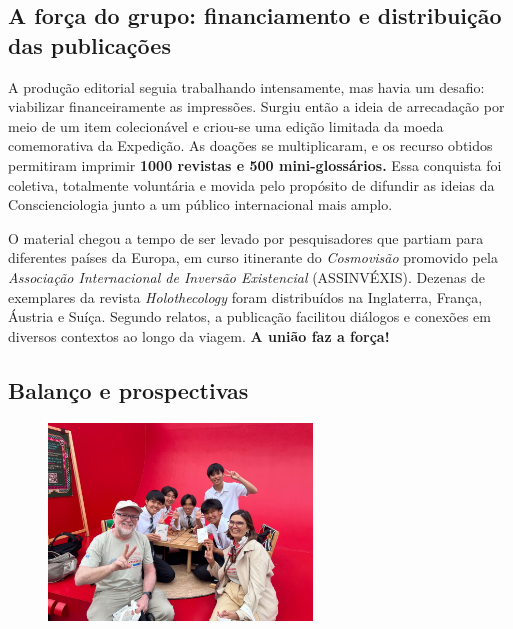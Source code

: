 \documentclass{gescons}
\begin{document}
\subsection*{A força do grupo: financiamento e distribuição das publicações}


A produção editorial seguia trabalhando intensamente, mas havia um desafio: viabilizar financeiramente as impressões. Surgiu então a ideia de arrecadação por meio de um item colecionável e criou-se uma edição limitada da moeda comemorativa da Expedição. As doações se multiplicaram, e os recurso obtidos permitiram imprimir \textbf{1000 revistas e 500 mini-glossários.} Essa conquista foi coletiva, totalmente voluntária e movida pelo propósito de difundir as ideias da Conscienciologia junto a um público internacional mais amplo.

O material chegou a tempo de ser levado por pesquisadores que partiam para diferentes países da Europa, em curso itinerante do \emph{Cosmovisão} promovido pela \emph{Associação Internacional de Inversão Existencial} (ASSINVÉXIS). Dezenas de exemplares da revista \emph{Holothecology} foram distribuídos na Inglaterra, França, Áustria e Suíça. Segundo relatos, a publicação facilitou diálogos e conexões em diversos contextos ao longo da viagem. \textbf{A união faz a força!}



\subsection*{Balanço e prospectivas}

\begin{figure}
  \vspace{-15mm}\hspace{-1mm}\includegraphics[width=7cm,trim={130 100 105 120},clip]{articles/resumo/fotos/materia3/japao.jpeg}
\end{figure}
\end{document}
